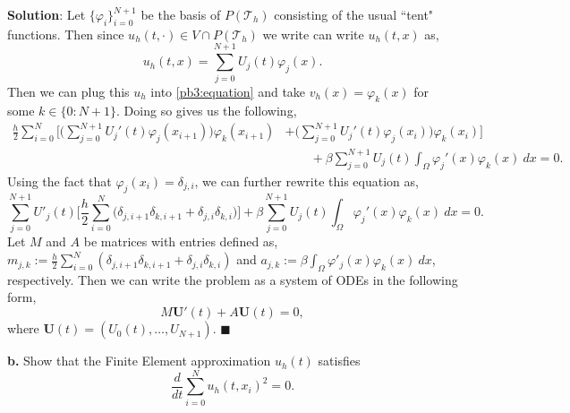 \documentclass[11pt]{article}
\begin{document}
\textbf{Solution}: Let $\{\varphi_i\}_{i=0}^{N+1}$ be the basis of $P(\mathcal{T}_h)$ consisting of the usual ``tent" functions.
Then since $u_h(t,\cdot) \in V \cap P(\mathcal{T}_h)$ we write can write $u_h(t,x)$ as,
\begin{equation}
    u_h(t,x) = \sum_{j=0}^{N+1} U_j(t) \varphi_j(x).
\end{equation}
Then we can plug this $u_h$ into \eqref{pb3:equation} and take $v_h(x) = \varphi_k(x)$ for some $k \in \{0:N+1\}$.
Doing so gives us the following,
\begin{equation}
\begin{split}
    \frac{h}{2} \sum_{i=0}^N \Bigg[ \Big(\sum_{j=0}^{N+1} U_j'(t) \varphi_j(x_{i+1}) \Big) \varphi_k(x_{i+1}) &+ \Big(\sum_{j=0}^{N+1} U_j'(t)  \varphi_j(x_i) \Big) \varphi_k(x_i) \Bigg] \\
    &\qquad + \beta \sum_{j=0}^{N+1} U_j(t) \int_\Omega \varphi_j'(x) \varphi_k(x) \: dx = 0.
\end{split}
\end{equation}
Using the fact that $\varphi_j(x_i) = \delta_{j,i}$, we can further rewrite this equation as,
\begin{equation}
    \sum_{j=0}^{N+1} U'_j(t) \Big[ \frac{h}{2} \sum_{i=0}^N  \big( \delta_{j,i+1} \delta_{k,i+1} + \delta_{j,i} \delta_{k,i} \big) \Big] + \beta \sum_{j=0}^{N+1} U_j(t) \int_\Omega \varphi_j'(x) \varphi_k(x) \: dx = 0. 
\end{equation}
Let $M$ and $A$ be matrices with entries defined as, $m_{j,k} := \tfrac{h}{2} \sum_{i=0}^N (\delta_{j,i+1} \delta_{k,i+1} + \delta_{j,i} \delta_{k,i})$
and $a_{j,k} := \beta \int_{\Omega} \varphi'_j(x) \varphi_k(x) \: dx$, respectively.
Then we can write the problem as a system of ODEs in the following form,
\begin{equation}
    M\mathbf{U}'(t) + A\mathbf{U}(t) = 0,
\end{equation}
where $\mathbf{U}(t) = (U_0(t), \ldots, U_{N+1})$.
$\blacksquare$


\vskip 2cm


\textbf{b.} Show that the Finite Element approximation $u_h(t)$ satisfies
\begin{equation}
    \frac{d}{dt} \sum_{i=0}^N u_h(t,x_i)^2 = 0.
\end{equation}

\vskip 1cm
\end{document}

